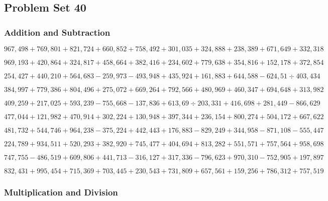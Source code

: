 \hypertarget{problem-set-40-5}{%
\subsection{Problem Set 40}\label{problem-set-40-5}}

\hypertarget{addition-and-subtraction-345}{%
\subsubsection{Addition and
Subtraction}\label{addition-and-subtraction-345}}

\(967,498+769,801+821,724+660,852+758,492+301,035+324,888+238,389+671,649+ 332,318\)

\(969,193+420,864+324,817+458,664+382,416+234,602+779,638+354,816+152,178+372,854\)

\(254,427+440,210+564,683-259,973-493,948+435,924+161,883+644,588-624,51÷403,434\)

\(384,997+779,386+804,496+275,072+669,264+792,566+480,969+460,347+694,648+313,982\)

\(409,259+217,025+593,239-755,668-137,836+613,69÷203,331+416,698+281,449-866,629\)

\(477,044+121,982+470,914+302,224+130,948+397,344+236,154+800,274+504,172+667,622\)

\(481,732+544,746+964,238-375,224+442,443+176,883-829,249+344,958-871,108-555,447\)

\(224,789+934,511+520,293+382,920+745,477+404,694+813,282+551,571+757,564+958,698\)

\(747,755-486,519+609,806+441,713-316,127+317,336-796,623+970,310-752,905+197,897\)

\(832,431+995,454+715,369+703,445+230,543+731,809+657,561+159,256+786,312+757,519\)

\hypertarget{multiplication-and-division-344}{%
\subsubsection{Multiplication and
Division}\label{multiplication-and-division-344}}

